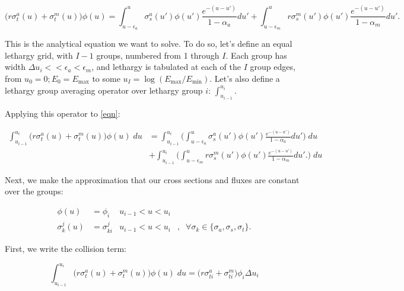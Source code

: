 \documentclass{article}
\begin{document}
        \begin{equation}
            \big(r \sigma_t^a(u) + \sigma_t^m(u) \big)  \phi(u) = 
            \int_{u - \epsilon_a}^{u} \sigma_s^a(u')\phi(u') \frac{e^{-(u-u')}}{1 - \alpha_a}du'  + 
            \int_{u - \epsilon_m}^{u} r \sigma_s^m(u')\phi(u') \frac{e^{-(u-u')}}{1 - \alpha_m}du'. \label{eqn}
        \end{equation}

        This is the analytical equation we want to solve. 
        To do so, let's define an equal lethargy grid, with $I-1$ groups, 
        numbered from 1 through $I$. 
        Each group has width $\Delta u_i << \epsilon_a < \epsilon_m$, 
        and lethargy is tabulated at each of the $I$ group edges,
        from $u_0 = 0; E_0 = E_\text{max}$
        to some $u_I  = \log{(E_\text{max}/E_\text{min})}$. 
        Let's also define a lethargy group averaging operator over lethargy group $i$: 
        $\int_{u_{i-1}}^{u_i}  $. 
             

        Applying this operator to \ref{eqn}:

         \begin{align}
             \int_{u_{i-1}}^{u_i} 
            \big(r \sigma_t^a(u) + \sigma_t^m(u) \big)  \phi(u) \; du &= 
             \int_{u_{i-1}}^{u_i} 
            \bigg(  
            \int_{u - \epsilon_a}^{u} \sigma_s^a(u')\phi(u') \frac{e^{-(u-u')}}{1 - \alpha_a}du'  
            \bigg)  \; du \\ &+ 
             \int_{u_{i-1}}^{u_i} 
            \bigg(  
            \int_{u - \epsilon_m}^{u} r \sigma_s^m(u')\phi(u') \frac{e^{-(u-u')}}{1 - \alpha_m}du'.
            \bigg)  \; du 
         \end{align}

         Next, we make the approximation that our cross sections and fluxes are constant over the groups:

         \begin{align}
             \phi(u) &= \phi_i & u_{i-1} < u < u_i &               \; \; \\
             \sigma_k^j(u) &= \sigma_{ki}^j & u_{i-1} < u < u_i &,  \; \;  
             \forall \sigma_k \in \{\sigma_a,\sigma_s,\sigma_t\}. 
         \end{align}

         First, we write the collision term:

          \begin{equation} 
             \int_{u_{i-1}}^{u_i} 
            \big(r \sigma_t^a(u) + \sigma_t^m(u) \big)  \phi(u) \; du = 
            \big( r \sigma_{ti}^a + \sigma_{ti}^m  \big) \phi_i \Delta u_i
          \end{equation}
\end{document}
